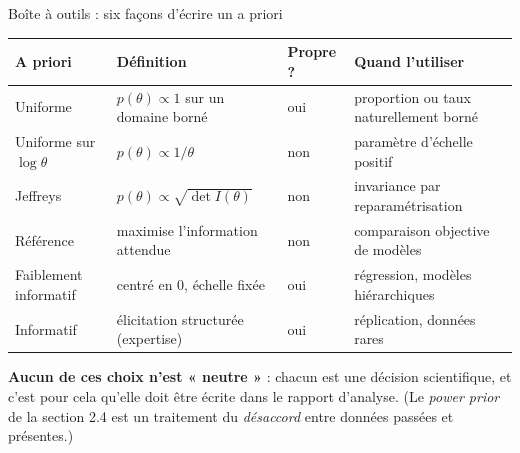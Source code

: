 \begin{frame}{Boîte à outils : six façons d'écrire un a priori}
\centering
\renewcommand{\arraystretch}{1.25}
\small
\footnotesize\scriptsize\begin{tabular}{@{}p{2.5cm}p{3.9cm}p{1.7cm}p{3.4cm}@{}}
\toprule
\textbf{A priori} & \textbf{Définition} & \textbf{Propre ?} & \textbf{Quand l'utiliser} \\
\midrule
Uniforme & $p(\theta) \propto 1$ sur un domaine borné & oui & proportion ou taux
naturellement borné \\[1mm]
Uniforme sur $\log\theta$ & $p(\theta) \propto 1/\theta$ & non & paramètre d'échelle
positif \\[1mm]
Jeffreys & $p(\theta) \propto \sqrt{\det I(\theta)}$ & non & invariance par
reparamétrisation \\[1mm]
Référence & maximise l'information attendue & non & comparaison objective de
modèles \\[1mm]
Faiblement informatif & centré en 0, échelle fixée & oui & régression, modèles
hiérarchiques \\[1mm]
Informatif & élicitation structurée (expertise) & oui & réplication, données
rares \\[1mm]
\bottomrule
\end{tabular}
\vspace{2mm}
\begin{tcolorbox}[colback=byPurple!6,colframe=byPurple,arc=2mm,width=.94\textwidth]
\small\centering
\textbf{Aucun de ces choix n'est « neutre »} : chacun est une décision scientifique,
et c'est pour cela qu'elle doit être écrite dans le rapport d'analyse.
(Le \emph{power prior} de la section 2.4 est un traitement du \emph{désaccord} entre
données passées et présentes.)
\end{tcolorbox}
\end{frame}

